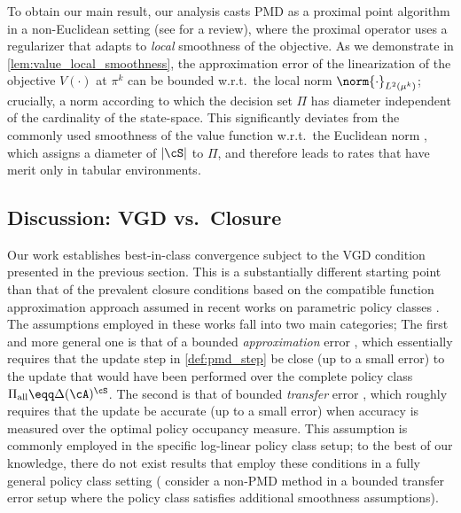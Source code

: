 To obtain our main result, our analysis casts
PMD as a proximal point algorithm 
in a non-Euclidean setting (see \citealp{teboulle2018simplified} for a review), where the proximal operator uses a regularizer that adapts to \emph{local} smoothness of the objective. As we demonstrate in \cref{lem:value_local_smoothness}, the approximation error of the linearization of the objective $V(\cdot)$ at $\pi^k$ can be bounded w.r.t.~the local norm $\norm{\cdot}_{L^2(\mu^k)}$; crucially, a norm according to which the decision set $\Pi$ has diameter independent of the cardinality of the state-space. 
This significantly deviates from the commonly used smoothness of the value function w.r.t.~the Euclidean norm \citep{agarwal2021theory}, which assigns a diameter of $|\cS|$ to $\Pi$, and therefore leads to rates that have merit only in tabular environments.


\subsection{Discussion: VGD vs.~Closure}
\label{sec:intro_discussion}
Our work establishes best-in-class convergence subject to the VGD condition presented in the previous section. This is a substantially different starting point than that of the prevalent closure conditions based on the compatible function approximation approach \citep{sutton1999policy} assumed in recent works on parametric policy classes \citep{agarwal2021theory,yuan2023loglinear,alfano2023novel,xiong2024dual}. 
The assumptions employed in these works fall into two main categories; The first and more general one is that of a bounded \emph{approximation} error \citep[e.g.,][]{alfano2023novel,yuan2023loglinear}, which essentially requires that the update step in \cref{def:pmd_step} be close (up to a small error) to the update that would have been performed over the complete policy class $\Pi_{\rm all} \eqq \Delta(\cA)^\cS$.
The second is that of bounded \emph{transfer} error \citep[e.g.,][]{agarwal2021theory,yuan2023loglinear}, which roughly requires that the update be accurate (up to a small error) when accuracy is measured over the optimal policy occupancy measure. This assumption is commonly employed in the specific log-linear policy class setup; to the best of our knowledge, there do not exist results that employ these conditions in a fully general policy class setting (\citealp{agarwal2021theory} consider a non-PMD method in a bounded transfer error setup where the policy class satisfies additional smoothness assumptions). 


